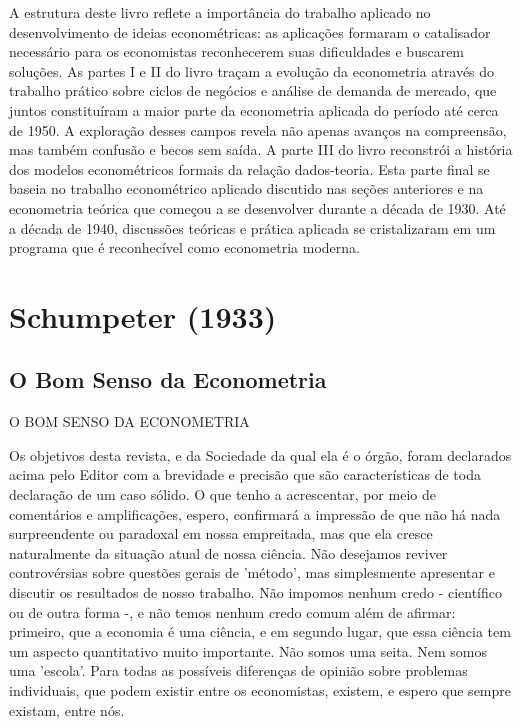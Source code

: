 \documentclass[12pt]{article}
\begin{document}
A estrutura deste livro reflete a importância do trabalho aplicado no desenvolvimento de ideias econométricas: as aplicações formaram o catalisador necessário para os economistas reconhecerem suas dificuldades e buscarem soluções. As partes I e II do livro traçam a evolução da econometria através do trabalho prático sobre ciclos de negócios e análise de demanda de mercado, que juntos constituíram a maior parte da econometria aplicada do período até cerca de 1950. A exploração desses campos revela não apenas avanços na compreensão, mas também confusão e becos sem saída. A parte III do livro reconstrói a história dos modelos econométricos formais da relação dados-teoria. Esta parte final se baseia no trabalho econométrico aplicado discutido nas seções anteriores e na econometria teórica que começou a se desenvolver durante a década de 1930. Até a década de 1940, discussões teóricas e prática aplicada se cristalizaram em um programa que é reconhecível como econometria moderna.

\section{\textbf{Schumpeter (1933)}}
\subsection{\textbf{O Bom Senso da Econometria}}
O BOM SENSO DA ECONOMETRIA

Os objetivos desta revista, e da Sociedade da qual ela é o órgão, foram declarados acima pelo Editor com a brevidade e precisão que são características de toda declaração de um caso sólido. O que tenho a acrescentar, por meio de comentários e amplificações, espero, confirmará a impressão de que não há nada surpreendente ou paradoxal em nossa empreitada, mas que ela cresce naturalmente da situação atual de nossa ciência. Não desejamos reviver controvérsias sobre questões gerais de 'método', mas simplesmente apresentar e discutir os resultados de nosso trabalho. Não impomos nenhum credo - científico ou de outra forma -, e não temos nenhum credo comum além de afirmar: primeiro, que a economia é uma ciência, e em segundo lugar, que essa ciência tem um aspecto quantitativo muito importante. Não somos uma seita. Nem somos uma 'escola'. Para todas as possíveis diferenças de opinião sobre problemas individuais, que podem existir entre os economistas, existem, e espero que sempre existam, entre nós.
\end{document}
